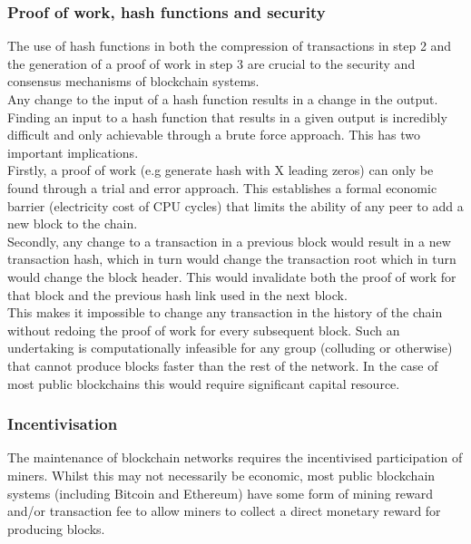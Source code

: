 \subsubsection{Proof of work, hash functions and security}
The use of hash functions in both the compression of transactions in step 2 and the generation of a proof of work in step 3 are crucial to the security and consensus mechanisms of blockchain systems.\\

Any change to the input of a hash function results in a change in the output. Finding an input to a hash function that results in a given output is incredibly difficult and only achievable through a  brute force approach. This has two important implications.\\

Firstly, a proof of work (e.g generate hash with X leading zeros) can only be found through a trial and error approach. This establishes a formal economic barrier (electricity cost of CPU cycles) that limits the ability of any peer to add a new block to the chain. \\

Secondly, any change to a transaction in a previous block would result in a new transaction hash, which in turn would change the transaction root which in turn would change the block header. This would invalidate both the proof of work for that block and the previous hash link used in the next block. \\

This makes it impossible to change any transaction in the history of the chain without redoing the proof of work for every subsequent block. Such an undertaking is computationally infeasible for any group (colluding or otherwise) that cannot produce blocks faster than the rest of the network. In the case of most public blockchains this would require significant capital resource. \\

\subsubsection{Incentivisation} 
The maintenance of blockchain networks requires the incentivised participation of miners. Whilst this may not necessarily be economic, most public blockchain systems (including Bitcoin and Ethereum) have some form of mining reward and/or transaction fee to allow miners to collect a direct monetary reward for producing blocks.\\

